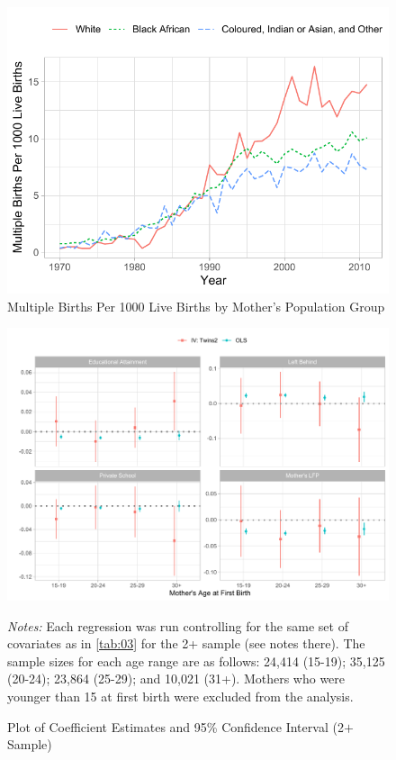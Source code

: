 \documentclass[11pt,a4paper]{article}
\newcommand\fnote[1]{\captionsetup{font=footnotesize}\caption*{#1}}
\begin{document}
\begin{figure}[h!]
\centering
\caption{\label{fig:03}Multiple Births Per 1000 Live Births by Mother's Population Group}
\includegraphics[width=\textwidth]{figures/line_pp.pdf}
\end{figure}

\begin{figure}[h!]
\centering
\caption{\label{fig:04}Plot of Coefficient Estimates and 95\% Confidence Interval (2$ + $ Sample)}
\includegraphics[width=\textwidth]{figures/age_mods.pdf}
\fnote{\textit{Notes:} Each regression was run controlling for the same set of covariates as in \autoref{tab:03} for the 2+ sample (see notes there). The sample sizes for each age range are as follows: 24,414 (15-19); 35,125 (20-24); 23,864 (25-29); and 10,021 (31+). Mothers who were younger than 15 at first birth were excluded from the analysis.}
\end{figure}
\end{document}
